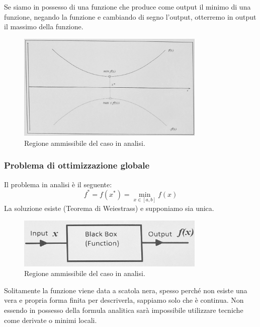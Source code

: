 \newpage
{}
Se siamo in possesso di una funzione che produce come output il minimo di una funzione, negando la funzione e cambiando di segno l'output, otterremo in output il massimo della funzione.
\begin{figure}[h!]
    \centering 
    \includegraphics[width=0.8\textwidth]{Esterni/Altro/imgs/20250226_105033.jpg} 
    \caption{Regione ammissibile del caso in analisi.} 
    \label{fig:glob_ott_amm_reg} 
\end{figure}

\subsubsection{Problema di ottimizzazione globale}
Il problema in analisi è il seguente:
\begin{displaymath}
    f^* = f(x^*) = \min_{x \in [a, b]}f(x)
\end{displaymath}
La soluzione esiste (Teorema di Weiestrass) e supponiamo sia unica.
\begin{figure}[h!]
    \centering 
    \includegraphics[width=0.8\textwidth]{Esterni/Altro/imgs/20250226_105447.jpg} 
    \caption{Regione ammissibile del caso in analisi.} 
    \label{fig:glob_ott_amm_reg} 
\end{figure}
Solitamente la funzione viene data a scatola nera, spesso perché non esiste una vera e propria forma finita per descriverla, sappiamo solo che è continua.
\newline
Non essendo in possesso della formula analitica sarà impossibile utilizzare tecniche come derivate o minimi locali.

